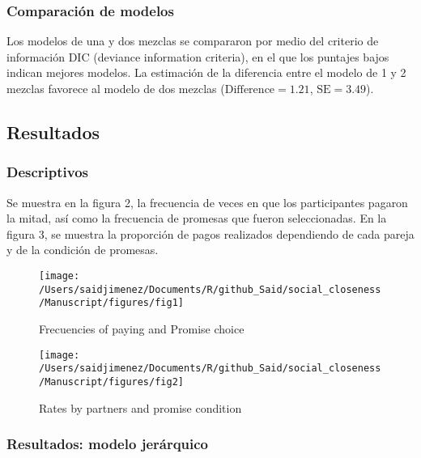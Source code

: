 \documentclass[]{article}
\begin{document}
\subsubsection{Comparación de modelos}\label{comparacion-de-modelos}

Los modelos de una y dos mezclas se compararon por medio del criterio de
información DIC (deviance information criteria), en el que los puntajes
bajos indican mejores modelos. La estimación de la diferencia entre el
modelo de 1 y 2 mezclas favorece al modelo de dos mezclas
(\(\mathrm{Difference}= 1.21\), \(\mathrm{SE}= 3.49\)).

\subsection{Resultados}\label{resultados}

\subsubsection{Descriptivos}\label{descriptivos}

Se muestra en la figura 2, la frecuencia de veces en que los
participantes pagaron la mitad, así como la frecuencia de promesas que
fueron seleccionadas. En la figura 3, se muestra la proporción de pagos
realizados dependiendo de cada pareja y de la condición de promesas.

\begin{figure}

{\centering \texttt{[image: /Users/saidjimenez/Documents/R/github\_Said/social\_closeness/Manuscript/figures/fig1]} 

}

\caption{Frecuencies of paying and Promise choice}\label{fig:fig2}
\end{figure}

\begin{figure}

{\centering \texttt{[image: /Users/saidjimenez/Documents/R/github\_Said/social\_closeness/Manuscript/figures/fig2]} 

}

\caption{Rates by partners and promise condition}\label{fig:fig3}
\end{figure}

\subsubsection{Resultados: modelo
jerárquico}\label{resultados-modelo-jerarquico}
\end{document}
